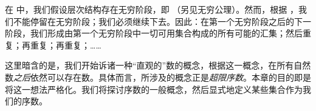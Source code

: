 \documentclass[../../../include/open-logic-section]{subfiles}
\begin{document}


在  中，我们假设层次结构存在无穷阶段，即 \stagesinf{}（另见无穷公理）。然而，根据 \stagessucc{}，我们不能停留在无穷阶段；我们必须继续下去。因此：在第一个无穷阶段之后的下一阶段，我们形成由第一个无穷阶段中一切可用集合构成的所有可能的汇集；然后重复；再重复；再重复；……

这里暗含的是，我们开始诉诸一种“直观的”数的概念，根据这一概念，在所有自然数\emph{之后}依然可以存在数。具体而言，所涉及的概念正是\emph{超限序数}。本章的目的即是将这一想法严格化。我们将探讨序数的一般概念，然后显式地定义某些集合作为我们的序数。
\end{document}
